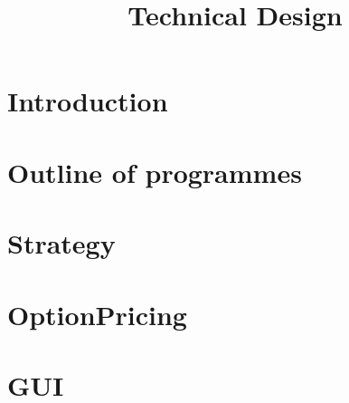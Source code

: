 \documentclass[12pt,a4paper,titlepage]{article}
\title {Technical Design}
\begin{document}
\maketitle
\section{Introduction}


\section{Outline of programmes}

\section{\FeedName}

\section{\AnalysisName}

\section{Strategy}
\section{OptionPricing}
\section{GUI}
%
\end{document}
